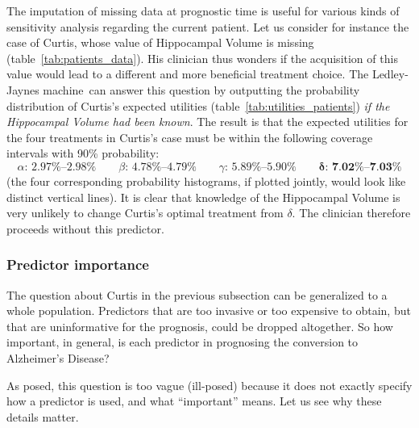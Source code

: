 \documentclass[utf8]{FrontiersinHarvard} %
\renewcommand*{\|}[1][]{\nonscript\:#1\vert\nonscript\:\mathopen{}}
\newcommand*{\ad}{Alzheimer's Disease}
\newcommand*{\ljm}{Ledley-Jaynes machine}
\begin{document}
The imputation of missing data at prognostic time is useful for various kinds of sensitivity analysis regarding the current patient. Let us consider for instance the case of Curtis, whose value of Hippocampal Volume is missing (table~\ref{tab:patients_data}). His clinician thus wonders if the acquisition of this value would lead to a different and more beneficial treatment choice. The \ljm\ can answer this question by outputting the probability distribution of Curtis's expected utilities (table~\ref{tab:utilities_patients}) \emph{if the Hippocampal Volume had been known}. The result is that the expected utilities for the four treatments in Curtis's case must be within the following coverage intervals with 90\% probability:
\begin{equation}
  \label{eq:possible_utilities_curtis}
  \alpha\text{: 2.97\%--2.98\%}\qquad
  \beta\text{: 4.78\%--4.79\%}\qquad
  \gamma\text{: 5.89\%--5.90\%}\qquad
  \bm{\delta}\textbf{: 7.02\%--7.03\%}
\end{equation}
(the four corresponding probability histograms, if plotted jointly, would look like distinct vertical lines). It is clear that knowledge of the Hippocampal Volume is very unlikely to change Curtis's optimal treatment from $\delta$. The clinician therefore proceeds without this predictor.

\subsubsection{Predictor importance}
\label{sec:predictor_importance}


The question about Curtis in the previous subsection can be generalized to a whole population. Predictors that are too invasive or too expensive to obtain, but that are uninformative for the prognosis, could be dropped altogether. So how important, in general, is each predictor in prognosing the conversion to \ad?

As posed, this question is too vague (ill-posed) because it does not exactly specify how a predictor is used, and what \enquote{important} means. Let us see why these details matter.

\end{document}
